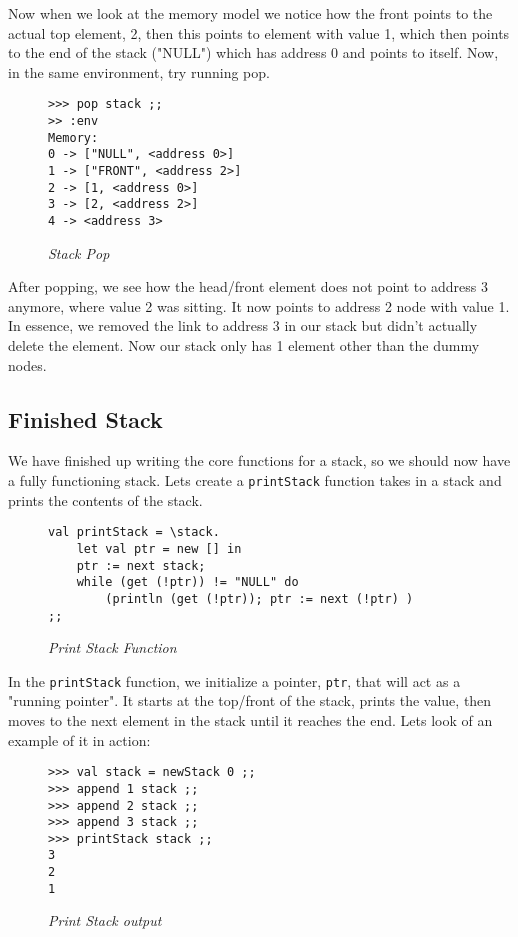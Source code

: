\documentclass{article}
\begin{document}
\medskip\noindent
Now when we look at the memory model we notice how the front points to the actual top element, 2, then this points to element with value 1, which then points to the end of the stack ("NULL") which has address 0 and points to itself. Now, in the same environment, try running pop.
\begin{figure}[H]
    \begin{lstlisting}
>>> pop stack ;;
>> :env
Memory:
0 -> ["NULL", <address 0>]
1 -> ["FRONT", <address 2>]
2 -> [1, <address 0>]
3 -> [2, <address 2>]
4 -> <address 3>
    \end{lstlisting}
    \caption{\textit{Stack Pop}}
\end{figure}

\noindent
After popping, we see how the head/front element does not point to address 3 anymore, where value 2 was sitting. It now points to address 2 node with value 1. In essence, we removed the link to address 3 in our stack but didn't actually delete the element. Now our stack only has 1 element other than the dummy nodes.

\subsection{Finished Stack}

\medskip\noindent
We have finished up writing the core functions for a stack, so we should now have a fully functioning stack. Lets create a \texttt{printStack} function takes in a stack and prints the contents of the stack.

\begin{figure}[H]
    \begin{lstlisting}
val printStack = \stack.
    let val ptr = new [] in 
    ptr := next stack;
    while (get (!ptr)) != "NULL" do 
        (println (get (!ptr)); ptr := next (!ptr) ) 
;;
    \end{lstlisting}
    \caption{\textit{Print Stack Function}}
\end{figure}

\noindent
In the \texttt{printStack} function, we initialize a pointer, \texttt{ptr}, that will act as a "running pointer". It starts at the top/front of the stack, prints the value, then moves to the next element in the stack until it reaches the end. Lets look of an example of it in action:

\begin{figure}[H]
    \begin{lstlisting}
>>> val stack = newStack 0 ;;
>>> append 1 stack ;;
>>> append 2 stack ;;
>>> append 3 stack ;;
>>> printStack stack ;;
3
2
1
    \end{lstlisting}
    \caption{\textit{Print Stack output}}
\end{figure}
\end{document}
